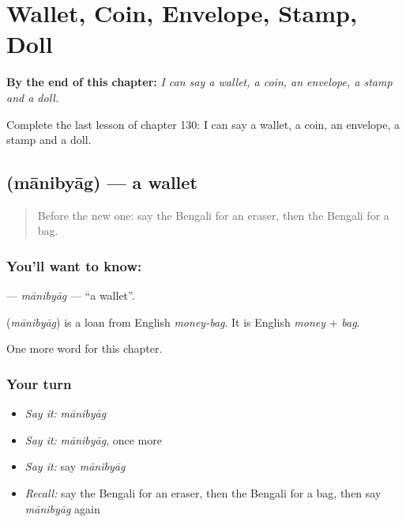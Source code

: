 
\chapter{Wallet, Coin, Envelope, Stamp, Doll}
\label{ch:bn-wallet-coin-envelope-stamp-doll}

\begin{chapteropening}
\textbf{By the end of this chapter:} \emph{I can say a wallet, a coin, an envelope, a stamp and a doll.}

Complete the last lesson of chapter 130: I can say a wallet, a coin, an envelope, a stamp and a doll.
\end{chapteropening}

\section[\texorpdfstring{\bn{মানিব্যাগ} (mānibyāg)}{মানিব্যাগ (mānibyāg)}]{ (mānibyāg) — a wallet}

\label{lesson:BN-C130-manibyag}



\begin{quote}
Before the new one: say the Bengali for an eraser, then the Bengali for a bag.
\end{quote}

\subsection*{You'll want to know: }
\textbf{} — \emph{mānibyāg} — \textquotedblleft{}a wallet\textquotedblright{}.

\begin{cousinweb}
\textbf{} (\emph{mānibyāg}) is a loan from English \emph{money-bag}. It is English \emph{money} + \emph{bag}.
\end{cousinweb}

\begin{grammarlens}[title={What you've built}]
One more word for this chapter.
\end{grammarlens}

\subsection*{Your turn}
\begin{itemize}
\raggedright
  \item \emph{Say it:} \emph{mānibyāg}
  \item \emph{Say it:} \emph{mānibyāg}, once more
  \item \emph{Say it:} say \emph{mānibyāg}
  \item \emph{Recall:} say the Bengali for an eraser, then the Bengali for a bag, then say \emph{mānibyāg} again
\end{itemize}

